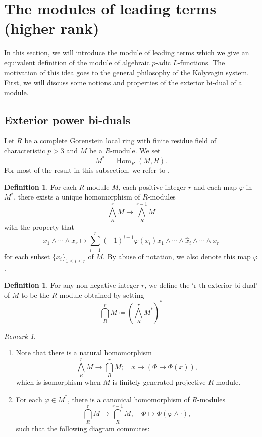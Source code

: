 \documentclass[10pt]{amsart}
\numberwithin{equation}{section}
\theoremstyle{definition}
\newtheorem{defn}[thm]{Definition}
\theoremstyle{remark} %
\newtheorem{rmk}[thm]{Remark}
\newcommand{\Hom}{\operatorname{Hom}}
\begin{document}
	
	
	
	
	
	\section{The modules of leading terms (higher rank)}
	\label{sec : module_leading}
	In this section, we will introduce the module of leading terms which we give an equivalent definition of the module of algebraic $ p $-adic $ L $-functions. The motivation of this idea goes to the general philosophy of the Kolyvagin system. First, we will discuss some notions and properties of the exterior bi-dual of a module.
	\subsection{Exterior power bi-duals}
	Let $R$ be a complete Gorenstein local ring with finite residue field of characteristic $p > 3$ and $M$ be a $R$-module. We set $$ M^*= \Hom_R(M,R) .$$ For most of the result in this subsection, we refer to \cite[]{BSS18}.
	\begin{defn}
		For each $R$-module $M$, each positive integer $r$ and each map $\varphi$ in $ M^* $, there exists a
		unique homomorphism of $R$-modules 
		$$ \bigwedge^r_R M \rightarrow \bigwedge^{r-1}_R M  $$
		with the property that $$x_1 \wedge \cdots \wedge x_r \mapsto \sum_{i=1}^r (-1)^{i+1} \varphi(x_i) x_1 \wedge \cdots \wedge \hat{x}_i \wedge \cdots \wedge x_r$$
		for each subset $ \{x_i\}_{1\le i \le r} $ of $ M $. By abuse of notation, we also denote this map $ \varphi $.
	\end{defn}
	\begin{defn}
		For any non-negative integer $r$, we define the ‘r-th exterior bi-dual’ of $ M $ to be the $R$-module obtained by setting 
		$$ \bigcap_R^r M \coloneqq \left(\bigwedge_R^r M^*\right)^* $$
	\end{defn}
	\begin{rmk} ---
		\begin{enumerate} 
			\item Note that there is a natural homomorphism 
			$$ \bigwedge_R^r M \rightarrow \bigcap_R^r M; \quad x \mapsto (\Phi \mapsto \Phi(x)),  $$
			which is isomorphism when $ M $	is finitely generated projective $R$-module. 
			\item For each $\varphi \in M^*$, there is a canonical homomorphism of $R$-modules 
			$$\bigcap_R^r M \rightarrow \bigcap_R^{r-1} M, \quad \Phi \mapsto \Phi(\varphi \wedge \cdot) ,$$
			such that the following diagram commutes:
			\begin{center}
			\end{center}
		\end{enumerate}
	\end{rmk}
\end{document}
